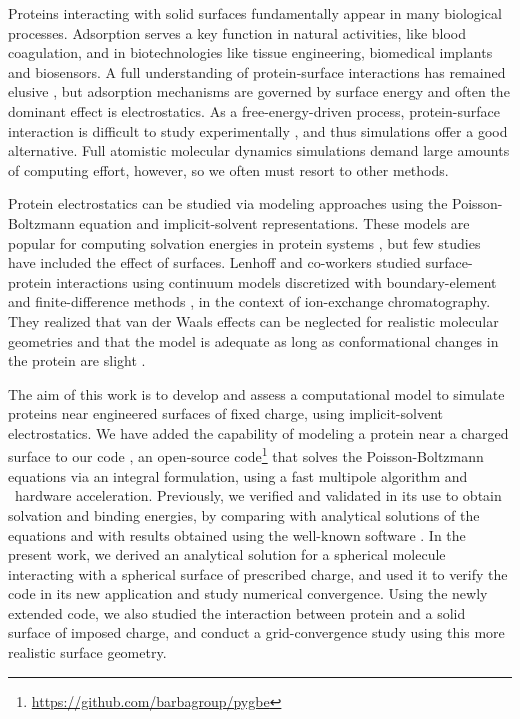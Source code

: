 
Proteins interacting with solid surfaces fundamentally appear in many biological processes. Adsorption serves a key function in natural activities, like blood coagulation, and  in biotechnologies like tissue engineering, biomedical implants and biosensors.
A full understanding of protein-surface interactions has remained elusive \cite{Gray2004,RabeVerdesSeegel2011}, but adsorption mechanisms are governed by surface energy and often the dominant effect is electrostatics. As a free-energy-driven process, protein-surface interaction is difficult to study experimentally \cite{MijajlovicETal2013}, and thus simulations offer a good alternative. Full atomistic molecular dynamics simulations demand large amounts of computing effort, however, so we often must resort to other methods.

Protein electrostatics can be studied via modeling approaches using the Poisson-Boltzmann equation and implicit-solvent representations. These models  are popular for computing solvation energies in protein systems \cite{RouxSimonson1999,Bardhan2012}, but few studies have included the effect of surfaces. Lenhoff and co-workers studied surface-protein interactions using continuum models discretized with boundary-element \cite{YoonLenhoff1992,RothLenhoff1993,AsthagiriLenhoff1997} and finite-difference methods \cite{YaoLenhoff2004,YaoLenhoff2005}, in the context of ion-exchange chromatography. They realized that van der Waals effects can be neglected for realistic molecular geometries \cite{RothNealLenhoff1996} and that the model is adequate as long as conformational changes in the protein are slight \cite{YaoLenhoff2004,YaoLenhoff2005}. 

The aim of this work is to develop and assess a computational model to simulate proteins near engineered surfaces of fixed charge, using implicit-solvent electrostatics.
We have added the capability of modeling a protein near a charged surface to our code \pygbe, an open-source code\footnote{\url{https://github.com/barbagroup/pygbe}}  that solves the Poisson-Boltzmann equations via an integral formulation, using a fast multipole algorithm and \gpu\ hardware acceleration.  Previously, we verified and validated \pygbe in its use to obtain solvation and binding energies, by comparing with analytical solutions of the equations and with results obtained using the well-known \apbs software \cite{CooperBarba-share154331,CooperBardhanBarba2013}. 
In the present work, we derived an analytical solution for a spherical molecule interacting with a spherical surface of prescribed charge, and used it to verify the code in its new application and study numerical convergence.
Using the newly extended code, we also studied the interaction between protein \gb and a solid surface of imposed charge, 
and conduct a grid-convergence study using this more realistic surface geometry.

